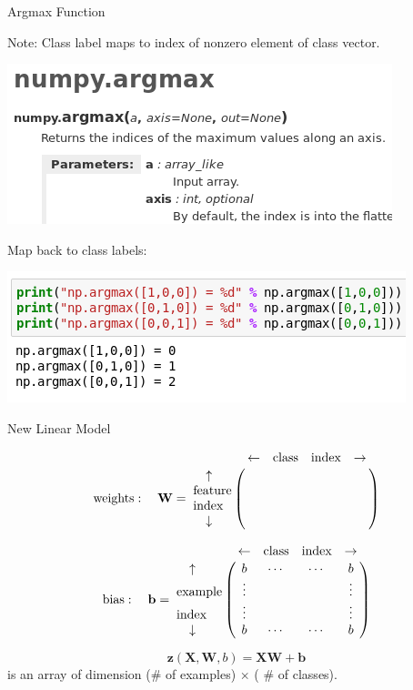 \documentclass[12pt,t]{beamer}
\begin{document}
\begin{frame}{Argmax Function}

Note: Class label maps to index of nonzero element of class vector. 

\centerline{
\includegraphics[height=0.4\textheight]{numpyargmax.png}
}

Map back to class labels:

\centerline{
\includegraphics[height=0.3\textheight]{numpyargmax2.png}
}

\end{frame}

\begin{frame}{New Linear Model}

\vspace{-8mm}
$$ \text{weights}:~~~\mathbf{W} = \bordermatrix{ & \leftarrow & \text{class} & \text{index} & \rightarrow  \cr
		~~~\uparrow &    & &    &\cr
		\text{feature} &  & &    & \cr
		\text{index} &   &&    &\cr
 		~~~\downarrow &   &&    &\cr
 		}$$

$$ \text{bias}:~~~\mathbf{b} =  \bordermatrix{ & \leftarrow & \text{class} & \text{index} & \rightarrow  \cr
		~~~\uparrow &  b  &\cdots& \cdots   & b\cr
		\text{example} &  \vdots &  &    &\vdots\cr
		\text{index} &  \vdots  &&    &\vdots\cr
 		~~~\downarrow & b  &\cdots&  \cdots &b\cr
 		}$$

$$ \mathbf{z}(\mathbf{X, W}, b) = \mathbf{X W} + \mathbf{b}$$
is an array of dimension (\# of examples) $\times$ ( \# of classes).
\end{frame}
\end{document}

